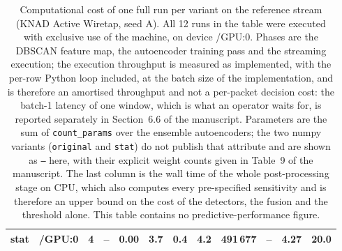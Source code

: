 \begin{table}[t]
\begin{tabular}{@{}llrrrrrrrrrr@{}}
  stat & /GPU:0 & 4 & -- & 0.00 & 3.7 & 0.4 & 4.2 & 491\,677 & -- & 4.27 & 20.0 \\
  \bottomrule
  \end{tabular}
  \caption{Computational cost of one full run per variant on the reference stream (KNAD Active Wiretap, seed A). All 12 runs in the table were executed with exclusive use of the machine, on device /GPU:0. Phases are the DBSCAN feature map, the autoencoder training pass and the streaming execution; the execution throughput is measured as implemented, with the per-row Python loop included, at the batch size of the implementation, and is therefore an amortised throughput and not a per-packet decision cost: the batch-1 latency of one window, which is what an operator waits for, is reported separately in Section~6.6 of the manuscript. Parameters are the sum of \texttt{count\_params} over the ensemble autoencoders; the two numpy variants (\texttt{original} and \texttt{stat}) do not publish that attribute and are shown as \texttt{--} here, with their explicit weight counts given in Table~9 of the manuscript. The last column is the wall time of the whole post-processing stage on CPU, which also computes every pre-specified sensitivity and is therefore an upper bound on the cost of the detectors, the fusion and the threshold alone. This table contains no predictive-performance figure.}
  \label{tab:cost}
\end{table}
